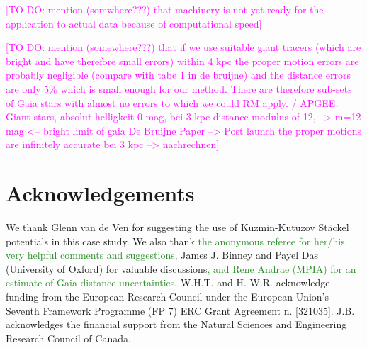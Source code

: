 \documentclass[iop,revtex4,numberedappendix,appendixfloats]{emulateapj}
\newcommand{\NEW}[1]{\textcolor{ForestGreen}{#1}}
\newcommand{\Wilma}[1]{\textcolor{Magenta}{#1}}
\begin{document}
\Wilma{[TO DO: mention (somwhere???) that machinery is not yet ready for the application to actual data because of computational speed]}

\Wilma{[TO DO: mention (somewhere???) that if we use suitable giant tracers (which are bright and have therefore small errors) within 4 kpc the proper motion errors are probably negligible (compare with tabe 1 in de bruijne) and the distance errors are only 5\% which is small enough for our method. There are therefore sub-sets of Gaia stars with almost no errors to which we could RM apply. / APGEE: Giant stars, absolut helligkeit 0 mag, bei 3 kpc distance modulus
of 12, --> m=12 mag <-- bright limit of gaia
De Bruijne Paper --> Post launch
the proper motions are infinitely accurate bei 3 kpc --> nachrechnen]}


\section{Acknowledgements}

We thank Glenn van de Ven for suggesting the use of Kuzmin-Kutuzov St\"{a}ckel potentials in this case study. We also thank \NEW{the anonymous referee for her/his very helpful comments and suggestions,} James J. Binney and Payel Das (University of Oxford) for valuable discussions\NEW{, and Rene Andrae (MPIA) for an estimate of Gaia distance uncertainties}. W.H.T. and H.-W.R. acknowledge funding from the European  Research Council under the European Union's Seventh Framework Programme (FP 7) ERC Grant Agreement n. [321035]. J.B. acknowledges the financial support from the Natural Sciences and Engineering Research Council of Canada. 

{}

\end{document}
